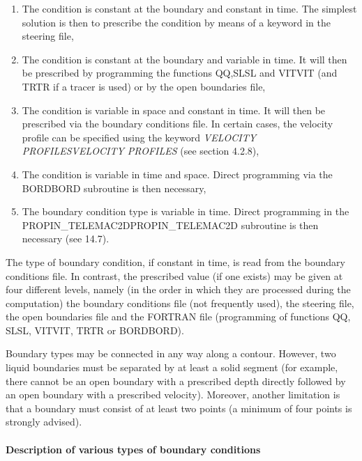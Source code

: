 \documentclass{article} %
\begin{document}
\begin{enumerate}
\item  The condition is constant at the boundary and constant in time. The simplest solution is then to prescribe the condition by means of a keyword in the steering file,

\item  The condition is constant at the boundary and variable in time. It will then be prescribed by programming the functions QQ,SLSL and VITVIT (and TRTR if a tracer is used) or by the open boundaries file,

\item  The condition is variable in space and constant in time. It will then be prescribed via the boundary conditions file. In certain cases, the velocity profile can be specified using the keyword \textit{VELOCITY PROFILESVELOCITY PROFILES} (see section 4.2.8),

\item  The condition is variable in time and space. Direct programming via the BORDBORD subroutine is then necessary,

\item  The boundary condition type is variable in time. Direct programming in the PROPIN\_TELEMAC2DPROPIN\_TELEMAC2D subroutine is then necessary (see 14.7).
\end{enumerate}

 The type of boundary condition, if constant in time, is read from the boundary conditions file. In contrast, the prescribed value (if one exists) may be given at four different levels, namely (in the order in which they are processed during the computation) the boundary conditions file (not frequently used), the steering file, the open boundaries file and the FORTRAN file (programming of functions QQ, SLSL, VITVIT, TRTR or BORDBORD).

 Boundary types may be connected in any way along a contour. However, two liquid boundaries must be separated by at least a solid segment (for example, there cannot be an open boundary with a prescribed depth directly followed by an open boundary with a prescribed velocity). Moreover, another limitation is that a boundary must consist of at least two points (a minimum of four points is strongly advised).


\paragraph{ Description of various types of boundary conditions}
\end{document}
